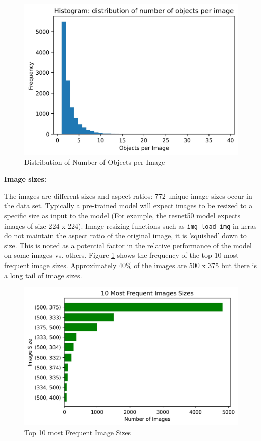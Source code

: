 \documentclass{article}
\begin{document}
\begin{figure}[h]
  \includegraphics[scale = 0.7]{hist_objects.jpg}
  \centering
  \caption{Distribution of Number of Objects per Image}
  \label{fig:objects_by_image}
\end{figure}


\textbf{Image sizes:}

The images are different sizes and aspect ratios: 772 unique image sizes occur in the data set. Typically a pre-trained model will expect images to be resized to a specific size as input to the model (For example, the resnet50 model expects images of size 224 x 224). Image resizing functions such as \lstinline{img_load_img} in keras do not maintain the aspect ratio of the original image, it is 'squished' down to size. This is noted as a potential factor in the relative performance of the model on some images vs. others. Figure \ref{fig:objects_by_image} shows the frequency of the top 10 most frequent image sizes. Approximately 40\% of the images are 500 x 375 but there is a long tail of image sizes.

\begin{figure}[h]
  \includegraphics[scale = 0.7]{aspect_ratio.jpg}
  \centering
  \caption{Top 10 most Frequent Image Sizes}
  \label{fig:aspect_ratios}
\end{figure}
\end{document}
